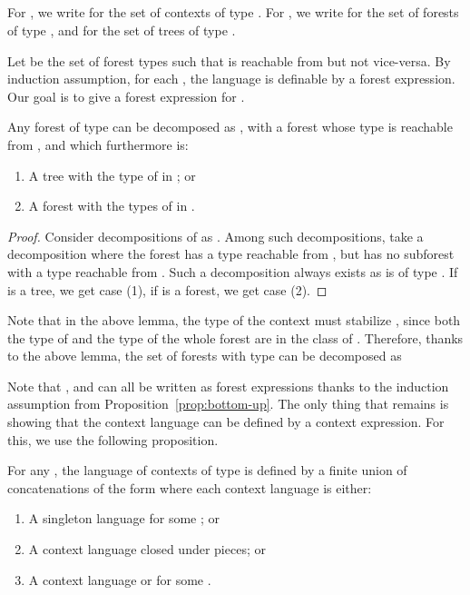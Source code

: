 \documentclass{LMCS}
\begin{document}
\subsection{\texorpdfstring{}{h+h notsim h}}
\label{sec:h-does-not-preserve-itself}

For , we write  for the set of contexts of type . For
, we write  for the set of forests of type , and
 for the set of trees of type .



Let  be the set of forest types  such that  is reachable from
 but not vice-versa.  By induction assumption,  for each ,
the  language 
is definable by a  forest expression. Our
goal is to give a  forest expression for .

\begin{lem}\label{lem:decompo-nonminim}
  Any forest  of type  can be decomposed as , with  a
  forest whose type is  reachable from , and which furthermore is:
\begin{enumerate}[\em(1)]
\item A tree  with the type of  in ; or
\item A forest  with the types of  in .
\end{enumerate}
\end{lem}
\begin{proof}
  Consider decompositions of  as . Among such decompositions,
  take a decomposition where the forest  has a type reachable from
  , but  has no subforest with a type reachable from . Such  a
  decomposition always exists as  is of type . If 
  is a tree, we get case (1), if  is a forest, we get case (2).
\end{proof}

Note that in the above lemma, the type of the context  must
stabilize , since both the type of  and the type of the whole
forest  are in the class of . Therefore, thanks to the above
lemma, the set  of forests with type  can be decomposed as

Note that ,  and  can all be written as
 forest expressions thanks to the induction assumption from
Proposition~\ref{prop:bottom-up}.  The only thing that remains is
showing that the context language  can be defined by a 
context expression.  For this, we use the following proposition.




\begin{prop}\label{prop:context-expression}
  For any , the language  of contexts of type  is
  defined by a finite union of concatenations of the form  where each context language  is either:
  \begin{enumerate}[\em(1)]
  \item A singleton language  for some ; or
\item A context language closed under pieces; or
\item  A  context  language    
  or  for  some .
  \end{enumerate}
\end{prop}
\end{document}
